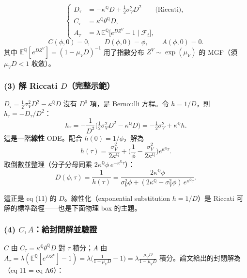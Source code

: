 \documentclass[12pt, a4paper]{article}
\theoremstyle{remark}
\newcommand{\E}{\mathbb{E}}
\newcommand{\Q}{\mathbb{Q}}
\begin{document}
\begin{keybox}[title={eq (A4)--(A5)：三條 ODE 與初值}]
\begin{equation}
  \left\{
  \begin{aligned}
    D_\tau &= -\kappa^\Q D + \tfrac12\sigma_V^2 D^2 \qquad\text{(Riccati)},\\
    C_\tau &= \kappa^\Q\theta^\Q D,\\
    A_\tau &= \lambda\,\E^\Q\!\big[e^{DZ^V}-1\mid\mathcal F_t\big],
  \end{aligned}
  \right.
  \tag{A4}
\end{equation}
\begin{equation}
  C(\phi,0)=0,\qquad D(\phi,0)=\phi,\qquad A(\phi,0)=0.
  \tag{A5}
\end{equation}
其中 $\E^\Q[e^{DZ^V}]=(1-\mu_V D)^{-1}$ 用了指數分布 $Z^V\sim\exp(\mu_V)$ 的 MGF（須 $\mu_V D<1$ 收斂）。
\end{keybox}

\subsubsection*{(3) 解 Riccati $D$（完整示範）}

\begin{derivbox}[title={常係數 Riccati $\to$ Bernoulli $\to$ 線性 ODE}]
$D_\tau = \frac12\sigma_V^2 D^2 - \kappa^\Q D$ 沒有 $D^0$ 項，是 Bernoulli 方程。令 $h=1/D$，則 $h_\tau = -D_\tau/D^2$：
\[
  h_\tau = -\frac{1}{D^2}\Big(\tfrac12\sigma_V^2 D^2 - \kappa^\Q D\Big)
  = -\tfrac12\sigma_V^2 + \kappa^\Q h.
\]
這是一階\textbf{線性} ODE。配合 $h(0)=1/\phi$，解為
\[
  h(\tau) = \frac{\sigma_V^2}{2\kappa^\Q} + \Big(\frac1\phi - \frac{\sigma_V^2}{2\kappa^\Q}\Big)e^{\kappa^\Q\tau}.
\]
取倒數並整理（分子分母同乘 $2\kappa^\Q\phi\,e^{-\kappa^\Q\tau}$）：
\[
  D(\phi,\tau) = \frac{1}{h(\tau)}
  = \frac{2\kappa^\Q\phi}{\sigma_V^2\phi + (2\kappa^\Q - \sigma_V^2\phi)\,e^{\kappa^\Q\tau}}.
\]
\end{derivbox}

這正是 eq (11) 的 $D$。線性化（exponential substitution $h=1/D$）是 Riccati 可解的標準路徑——也是下面物理 box 的主題。

\subsubsection*{(4) $C,A$：給封閉解並驗證}

$C$ 由 $C_\tau=\kappa^\Q\theta^\Q D$ 對 $\tau$ 積分；$A$ 由 $A_\tau=\lambda(\E^\Q[e^{DZ^V}]-1)=\lambda\big(\frac{1}{1-\mu_V D}-1\big)=\lambda\frac{\mu_V D}{1-\mu_V D}$ 積分。論文給出的封閉解為（eq 11 = eq A6）：
\end{document}
